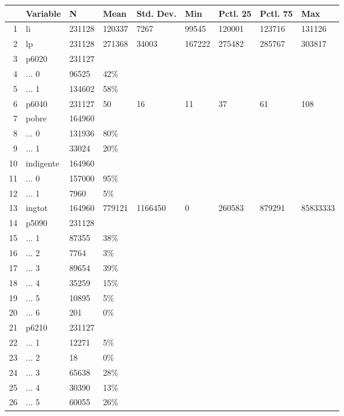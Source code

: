 \begin{tabular}{rllllllll}
  \hline
 & Variable & N & Mean & Std. Dev. & Min & Pctl. 25 & Pctl. 75 & Max \\ 
  \hline
1 & li & 231128 & 120337 & 7267 & 99545 & 120001 & 123716 & 131126 \\ 
  2 & lp & 231128 & 271368 & 34003 & 167222 & 275482 & 285767 & 303817 \\ 
  3 & p6020 & 231127 &  &  &  &  &  &  \\ 
  4 & ... 0 & 96525 & 42\% &  &  &  &  &  \\ 
  5 & ... 1 & 134602 & 58\% &  &  &  &  &  \\ 
  6 & p6040 & 231127 & 50 & 16 & 11 & 37 & 61 & 108 \\ 
  7 & pobre & 164960 &  &  &  &  &  &  \\ 
  8 & ... 0 & 131936 & 80\% &  &  &  &  &  \\ 
  9 & ... 1 & 33024 & 20\% &  &  &  &  &  \\ 
  10 & indigente & 164960 &  &  &  &  &  &  \\ 
  11 & ... 0 & 157000 & 95\% &  &  &  &  &  \\ 
  12 & ... 1 & 7960 & 5\% &  &  &  &  &  \\ 
  13 & ingtot & 164960 & 779121 & 1166450 & 0 & 260583 & 879291 & 85833333 \\ 
  14 & p5090 & 231128 &  &  &  &  &  &  \\ 
  15 & ... 1 & 87355 & 38\% &  &  &  &  &  \\ 
  16 & ... 2 & 7764 & 3\% &  &  &  &  &  \\ 
  17 & ... 3 & 89654 & 39\% &  &  &  &  &  \\ 
  18 & ... 4 & 35259 & 15\% &  &  &  &  &  \\ 
  19 & ... 5 & 10895 & 5\% &  &  &  &  &  \\ 
  20 & ... 6 & 201 & 0\% &  &  &  &  &  \\ 
  21 & p6210 & 231127 &  &  &  &  &  &  \\ 
  22 & ... 1 & 12271 & 5\% &  &  &  &  &  \\ 
  23 & ... 2 & 18 & 0\% &  &  &  &  &  \\ 
  24 & ... 3 & 65638 & 28\% &  &  &  &  &  \\ 
  25 & ... 4 & 30390 & 13\% &  &  &  &  &  \\ 
  26 & ... 5 & 60055 & 26\% &  &  &  &  &  \\ 

\end{tabular}
